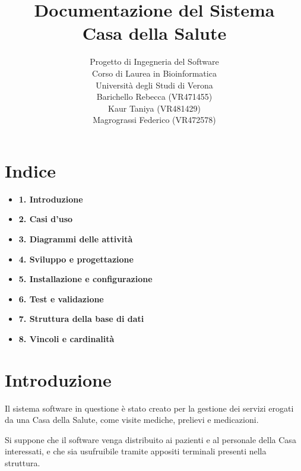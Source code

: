 \documentclass[a4paper,12pt]{article}
\begin{document}
\title{
    \textbf{\Huge Documentazione del Sistema}\\[0.5em]
    \textbf{\Huge Casa della Salute}
}
\author{
    \vspace{20pt}
    \Large Progetto di Ingegneria del Software\\[0.3em]
    Corso di Laurea in Bioinformatica\\[0.3em]
    Università degli Studi di Verona\\[1.5em]
    \normalsize
    Barichello Rebecca (VR471455)\\
    \normalsize
    Kaur Taniya (VR481429)\\
    \normalsize
    Magrograssi Federico (VR472578)
}
\date{}

\maketitle
\thispagestyle{empty}
\newpage

\section*{Indice}
\begin{itemize}
    \item \textbf{1. Introduzione} \dotfill 
    \item \textbf{2. Casi d'uso} \dotfill 
    \item \textbf{3. Diagrammi delle attività} 
    \item \textbf{4. Sviluppo e progettazione} \dotfill 
    \item \textbf{5. Installazione e configurazione} \dotfill 
    \item \textbf{6. Test e validazione} \dotfill 
    \item \textbf{7. Struttura della base di dati} \dotfill 
    \item \textbf{8. Vincoli e cardinalità} \dotfill 
\end{itemize}
\newpage

\section{Introduzione}
Il sistema software in questione è stato creato per la gestione dei servizi erogati da una Casa della Salute, come visite mediche, prelievi e medicazioni.

Si suppone che il software venga distribuito ai pazienti e al personale della Casa interessati, 
e che sia usufruibile tramite appositi terminali presenti nella struttura.
\end{document}
